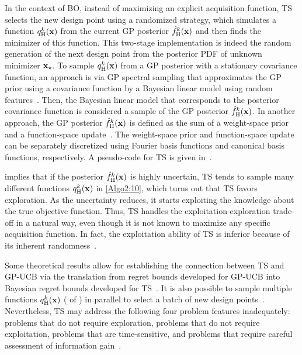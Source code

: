 \documentclass[journal ]{new-aiaa}
\newcommand{\edit}[1]{\textcolor{red!80!black}{#1}} %
\begin{document}
	In the context of BO, instead of maximizing an explicit acquisition function, TS selects the new design point using a randomized strategy, which simulates a function $q_\text{H}^k({\bf x})$ from the current GP posterior $\hat{f}_\text{H}^k({\bf x})$ and then finds the minimizer of this function.
	{This two-stage implementation is indeed the random generation of the next design point from the posterior PDF of unknown minimizer ${\bf x}_\star$.}
	To sample $q_\text{H}^k({\bf x})$ from a GP posterior with a stationary covariance function, an approach is via GP spectral sampling that approximates the GP prior using a covariance function by a Bayesian linear model using random features~\citep{HernandezLobato2014}.
	Then, the Bayesian linear model that corresponds to the posterior covariance function is considered a sample of the GP posterior $\hat{f}_\text{H}^k({\bf x})$.
	In another approach, the GP posterior $\hat{f}_\text{H}^k({\bf x})$ is defined as the sum of a weight-space prior and a function-space update~\citep{Wilson2020}.
	The weight-space prior and function-space update can be separately discretized using Fourier basis functions and canonical basis functions, respectively. 
	A pseudo-code for TS is given in~.
	
	 implies that if the posterior $\hat{f}_\text{H}^k({\bf x})$ is highly uncertain, TS tends to sample many different functions $q_\text{H}^k({\bf x})$ in \cref{Algo2:10}, which turns out that TS favors exploration.
	As the uncertainty reduces, it starts exploiting the knowledge about the true objective function.
	Thus, TS handles the exploitation-exploration trade-off in a natural way, even though it is not known to maximize any specific acquisition function. 
	In fact, the exploitation ability of TS is inferior because of its inherent randomness~\citep{Scott2010}.
	
	Some theoretical results allow for establishing the connection between TS and GP-UCB via the translation from regret bounds developed for GP-UCB into Bayesian regret bounds developed for TS~\citep{Russo2014}.
	It is also possible to sample multiple functions $q_\text{H}^k({\bf x})$ ( of ) in parallel to select a batch of new design points~\citep{Kandasamy2018}.
	Nevertheless, TS may address the following four problem features inadequately: problems that do not require exploration, problems that do not require exploitation, problems that are time-sensitive, and problems that require careful assessment of information gain~\citep{Russo2018}.
	
\end{document}
